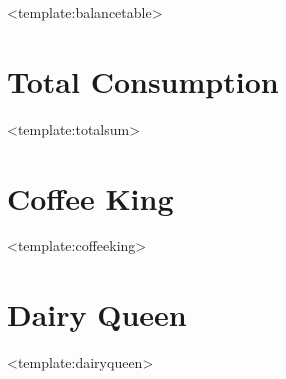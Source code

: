 \documentclass[a4paper, 10pt]{article}
\begin{document}
<template:balancetable>

\newpage

\section*{\centering Total Consumption}

<template:totalsum>

\vspace{2cm}

\section*{\centering Coffee King}

<template:coffeeking>

\vspace{2cm}

\section*{\centering Dairy Queen}

<template:dairyqueen>
\end{document}
